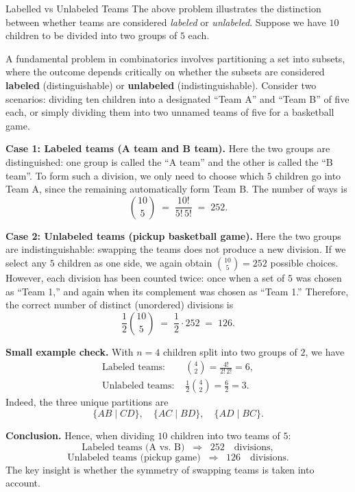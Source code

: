 \begin{keyconceptboxbreak}{Labelled vs Unlabeled Teams}
The above problem illustrates the distinction between whether teams are considered \emph{labeled} or \emph{unlabeled}. Suppose we have $10$ children to be divided into two groups of $5$ each.

A fundamental problem in combinatorics involves partitioning a set into subsets, where the outcome depends critically on whether the subsets are considered \textbf{labeled} (distinguishable) or \textbf{unlabeled} (indistinguishable). Consider two scenarios: dividing ten children into a designated ``Team A'' and ``Team B'' of five each, or simply dividing them into two unnamed teams of five for a basketball game.

\medskip
\textbf{Case 1: Labeled teams (A team and B team).}  
Here the two groups are distinguished: one group is called the ``A team'' and the other is called the ``B team''. To form such a division, we only need to choose which $5$ children go into Team A, since the remaining automatically form Team B. The number of ways is
\begin{equation}
\binom{10}{5} \;=\; \frac{10!}{5!\,5!} \;=\; 252.
\end{equation}

\medskip
\textbf{Case 2: Unlabeled teams (pickup basketball game).}  
Here the two groups are indistinguishable: swapping the teams does not produce a new division. If we select any $5$ children as one side, we again obtain $\binom{10}{5} = 252$ possible choices. However, each division has been counted twice: once when a set of $5$ was chosen as ``Team 1,'' and again when its complement was chosen as ``Team 1.'' Therefore, the correct number of distinct (unordered) divisions is
\begin{equation}
\frac{1}{2}\binom{10}{5} \;=\; \frac{1}{2}\cdot 252 \;=\; 126.
\end{equation}

\medskip
\textbf{Small example check.}  
With $n=4$ children split into two groups of $2$, we have
\begin{align}
\text{Labeled teams: } & \binom{4}{2} = \frac{4!}{2!\,2!} = 6, \\
\text{Unlabeled teams: } & \frac{1}{2}\binom{4}{2} = \frac{6}{2} = 3.
\end{align}
Indeed, the three unique partitions are
\begin{equation}
\{AB \mid CD\}, \quad \{AC \mid BD\}, \quad \{AD \mid BC\}.
\end{equation}

\medskip
\textbf{Conclusion.}  
Hence, when dividing $10$ children into two teams of $5$:
\[
\text{Labeled teams (A vs. B)} \;\;\Rightarrow\;\; 252 \quad \text{divisions},
\]
\[
\text{Unlabeled teams (pickup game)} \;\;\Rightarrow\;\; 126 \quad \text{divisions}.
\]
The key insight is whether the symmetry of swapping teams is taken into account.

\end{keyconceptboxbreak}


